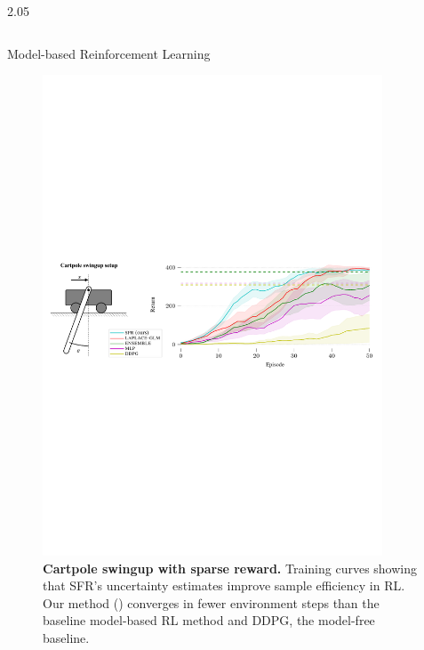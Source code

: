 \documentclass[final,12pt]{beamer}
\newlength{\colwidth}
\newcommand{\our}{SFR}
\begin{document}
\begin{frame}[t]
\begin{columns}[t]
\begin{column}{2.05\colwidth}
\begin{columns}[t]
\begin{column}{\colwidth}
\begin{block}{Model-based Reinforcement Learning}
        \begin{figure}[!t]
        \centering\scriptsize
        \includegraphics[width=0.9\textwidth]{fig/rl.pdf}
        \caption{\footnotesize \textbf{Cartpole swingup with sparse reward.} Training curves showing that \our's uncertainty estimates improve sample efficiency in RL.
        Our method () converges in fewer environment steps than the baseline model-based RL method and DDPG, the model-free baseline.}
        \label{fig:rl}
        \end{figure}


\end{block}
\end{column}
\end{columns}
\end{column}
\end{columns}
\end{frame}
\end{document}
